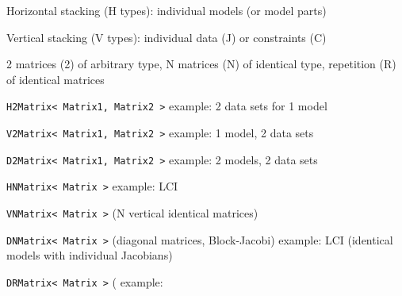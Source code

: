 Horizontal stacking (H types): individual models (or model parts)

Vertical stacking (V types): individual data (J) or constraints (C)

2 matrices (2) of arbitrary type, N matrices (N) of identical type, repetition (R) of identical matrices

\lstinline|H2Matrix< Matrix1, Matrix2 >|
example: 2 data sets for 1 model

\lstinline|V2Matrix< Matrix1, Matrix2 >| example: 1 model, 2 data sets

\lstinline|D2Matrix< Matrix1, Matrix2 >| example: 2 models, 2 data sets

\lstinline|HNMatrix< Matrix >| example: LCI 

\lstinline|VNMatrix< Matrix >| (N vertical identical matrices)

\lstinline|DNMatrix< Matrix >| (diagonal matrices, Block-Jacobi)
example: LCI (identical models with individual Jacobians)

\lstinline|DRMatrix< Matrix >| (
example: 
